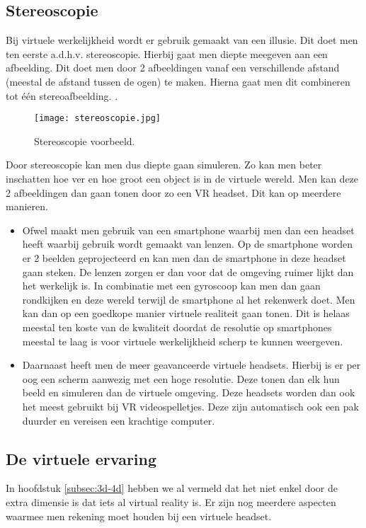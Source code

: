\subsection{Stereoscopie}
\label{subsec:stereoscopie}
Bij virtuele werkelijkheid wordt er gebruik gemaakt van een illusie. Dit doet men ten eerste a.d.h.v. stereoscopie. Hierbij gaat men diepte meegeven aan een afbeelding. Dit doet men door 2 afbeeldingen vanaf een verschillende afstand (meestal de afstand tussen de ogen) te maken. Hierna gaat men dit combineren tot één stereoafbeelding. \autocite{Rouse2011}.

\begin{figure}
	\centering
	\texttt{[image: stereoscopie.jpg]}
	\caption{Stereoscopie voorbeeld.}
	\label{fig:stereoscopie}
\end{figure}

Door stereoscopie kan men dus diepte gaan simuleren. Zo kan men beter inschatten hoe ver en hoe groot een object is in de virtuele wereld. Men kan deze 2 afbeeldingen dan gaan tonen door zo een VR headset. Dit kan op meerdere manieren.
\begin{itemize}
	\item Ofwel maakt men gebruik van een smartphone waarbij men dan een headset heeft waarbij gebruik wordt gemaakt van lenzen. Op de smartphone worden er 2 beelden geprojecteerd en kan men dan de smartphone in deze headset gaan steken. De lenzen zorgen er dan voor dat de omgeving ruimer lijkt dan het werkelijk is. In combinatie met een gyroscoop kan men dan gaan rondkijken en deze wereld terwijl de smartphone al het rekenwerk doet. Men kan dan op een goedkope manier virtuele realiteit gaan tonen. Dit is helaas meestal ten koste van de kwaliteit doordat de resolutie op smartphones meestal te laag is voor virtuele werkelijkheid scherp te kunnen weergeven.
	
	\item Daarnaast heeft men de meer geavanceerde virtuele headsets. Hierbij is er per oog een scherm aanwezig met een hoge resolutie. Deze tonen dan elk hun beeld en simuleren dan de virtuele omgeving. Deze headsets worden dan ook het meest gebruikt bij VR videospelletjes. Deze zijn automatisch ook een pak duurder en vereisen een krachtige computer.
\end{itemize}

\subsection{De virtuele ervaring}
\label{subsec:vr-ervaring}
In hoofdstuk \ref{subsec:3d-4d} hebben we al vermeld dat het niet enkel door de extra dimensie is dat iets al virtual reality is. Er zijn nog meerdere aspecten waarmee men rekening moet houden bij een virtuele headset.

